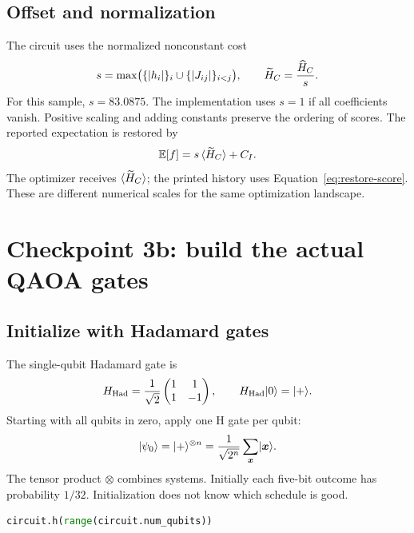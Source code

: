 \subsection{Offset and normalization}
The circuit uses the normalized nonconstant cost
\begin{equation}\label{eq:normalized}
s=\max\bigl(\{|h_i|\}_i\cup\{|J_{ij}|\}_{i<j}\bigr),\qquad
\widetilde H_C=\frac{\widehat H_C}{s}.
\end{equation}
For this sample, $s=83.0875$. The implementation uses $s=1$ if all coefficients
vanish. Positive scaling and adding constants preserve the ordering of scores.
The reported expectation is restored by
\begin{equation}\label{eq:restore-score}
\mathbb E[f]=s\,\langle \widetilde H_C\rangle+C_I.
\end{equation}
The optimizer receives $\langle \widetilde H_C\rangle$; the printed history uses
Equation~\eqref{eq:restore-score}. These are different numerical scales for the
same optimization landscape.

\section{Checkpoint 3b: build the actual QAOA gates}\label{sec:gates}
\subsection{Initialize with Hadamard gates}
The single-qubit Hadamard gate is
\begin{equation}
H_{\mathrm{Had}}=\frac1{\sqrt2}\begin{pmatrix}1&1\\1&-1\end{pmatrix},
\qquad H_{\mathrm{Had}}\lvert 0\rangle=\lvert +\rangle.
\end{equation}
Starting with all qubits in zero, apply one H gate per qubit:
\begin{equation}
\lvert \psi_0\rangle=\lvert +\rangle^{\otimes n}
=\frac1{\sqrt{2^n}}\sum_{\boldsymbol{x}}\lvert \boldsymbol{x}\rangle.
\end{equation}
The tensor product $\otimes$ combines systems. Initially each five-bit outcome
has probability $1/32$. Initialization does not know which schedule is good.
\begin{lstlisting}[language=Python]
circuit.h(range(circuit.num_qubits))
\end{lstlisting}

